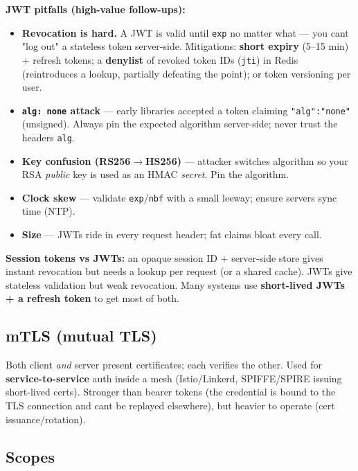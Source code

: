 \documentclass[11pt]{article}
\providecommand{\tightlist}{\setlength{\itemsep}{1pt}\setlength{\parskip}{0pt}}
\begin{document}
\textbf{JWT pitfalls (high-value follow-ups):}

\begin{itemize}
\tightlist
\item
  \textbf{Revocation is hard.} A JWT is valid until \texttt{exp} no matter what --- you can\textquotesingle t "log out" a stateless token server-side. Mitigations: \textbf{short expiry} (5--15 min) + refresh tokens; a \textbf{denylist} of revoked token IDs (\texttt{jti}) in Redis (reintroduces a lookup, partially defeating the point); or token versioning per user.
\item
  \textbf{\texttt{alg:\ none} attack} --- early libraries accepted a token claiming \texttt{"alg":"none"} (unsigned). Always pin the expected algorithm server-side; never trust the header\textquotesingle s \texttt{alg}.
\item
  \textbf{Key confusion (RS256\(\rightarrow\)HS256)} --- attacker switches algorithm so your RSA \emph{public} key is used as an HMAC \emph{secret}. Pin the algorithm.
\item
  \textbf{Clock skew} --- validate \texttt{exp}/\texttt{nbf} with a small leeway; ensure servers sync time (NTP).
\item
  \textbf{Size} --- JWTs ride in every request header; fat claims bloat every call.
\end{itemize}

\textbf{Session tokens vs JWTs:} an opaque session ID + server-side store gives instant revocation but needs a lookup per request (or a shared cache). JWTs give stateless validation but weak revocation. Many systems use \textbf{short-lived JWTs + a refresh token} to get most of both.

\subsection{mTLS (mutual TLS)}\label{mtls-mutual-tls}

Both client \emph{and} server present certificates; each verifies the other. Used for \textbf{service-to-service} auth inside a mesh (Istio/Linkerd, SPIFFE/SPIRE issuing short-lived certs). Stronger than bearer tokens (the credential is bound to the TLS connection and can\textquotesingle t be replayed elsewhere), but heavier to operate (cert issuance/rotation).

\subsection{Scopes}\label{scopes}
\end{document}
